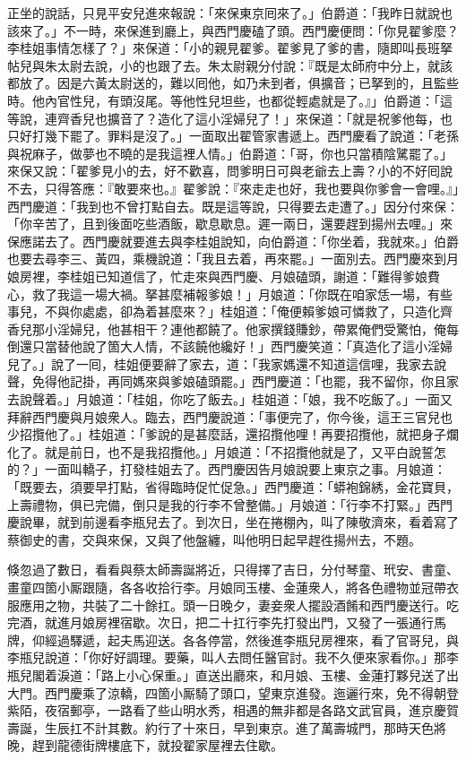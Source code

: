 正坐的說話，只見平安兒進來報說：「來保東京囘來了。」伯爵道：「我昨日就說也該來了。」不一時，來保進到廳上，與西門慶磕了頭。西門慶便問：「你見翟爹麼？李桂姐事情怎樣了？」來保道：「小的親見翟爹。翟爹見了爹的書，隨即叫長班拏帖兒與朱太尉去說，小的也跟了去。朱太尉親分付說：『既是太師府中分上，就該都放了。因是六黃太尉送的，難以囘他，如乃未到者，俱擴音；已拏到的，且監些時。他內官性兒，有頭沒尾。等他性兒坦些，也都從輕處就是了。』」伯爵道：「這等說，連齊香兒也擴音了？造化了這小淫婦兒了！」來保道：「就是祝爹他每，也只好打幾下罷了。罪料是沒了。」一面取出翟管家書遞上。西門慶看了說道：「老孫與祝麻子，做夢也不曉的是我這裡人情。」伯爵道：「哥，你也只當積陰騭罷了。」來保又說：「翟爹見小的去，好不歡喜，問爹明日可與老爺去上壽？小的不好囘說不去，只得答應：『敢要來也。』翟爹說：『來走走也好，我也要與你爹會一會哩。』」西門慶道：「我到也不曾打點自去。既是這等說，只得要去走遭了。」因分付來保：「你辛苦了，且到後面吃些酒飯，歇息歇息。遲一兩日，還要趕到揚州去哩。」來保應諾去了。西門慶就要進去與李桂姐說知，向伯爵道：「你坐着，我就來。」伯爵也要去尋李三、黃四，乘機說道：「我且去着，再來罷。」一面別去。西門慶來到月娘房裡，李桂姐已知道信了，忙走來與西門慶、月娘磕頭，謝道：「難得爹娘費心，救了我這一場大禍。拏甚麼補報爹娘！」{}月娘道：「你既在咱家恁一場，有些事兒，不與你處處，卻為着甚麼來？」桂姐道：「俺便賴爹娘可憐救了，只造化齊香兒那小淫婦兒，他甚相干？連他都饒了。他家撰錢賺鈔，帶累俺們受驚怕，俺每倒還只當替他說了箇大人情，不該饒他纔好！」{}西門慶笑道：「真造化了這小淫婦兒了。」說了一囘，桂姐便要辭了家去，道：「我家媽還不知道這信哩，我家去說聲，免得他記掛，再同媽來與爹娘磕頭罷。」西門慶道：「也罷，我不留你，你且家去說聲着。」月娘道：「桂姐，你吃了飯去。」桂姐道：「娘，我不吃飯了。」一面又拜辭西門慶與月娘衆人。臨去，西門慶說道：「事便完了，你今後，這王三官兒也少招攬他了。」{}{}桂姐道：「爹說的是甚麼話，還招攬他哩！再要招攬他，就把身子爛化了。就是前日，也不是我招攬他。」{}月娘道：「不招攬他就是了，又平白說誓怎的？」一面叫轎子，打發桂姐去了。西門慶因告月娘說要上東京之事。月娘道：「既要去，須要早打點，省得臨時促忙促急。」西門慶道：「蟒袍錦綉，金花寶貝，上壽禮物，俱已完備，倒只是我的行李不曾整備。」月娘道：「行李不打緊。」西門慶說畢，就到前邊看李瓶兒去了。到次日，坐在捲棚內，叫了陳敬濟來，看着寫了蔡御史的書，交與來保，又與了他盤纏，叫他明日起早趕徃揚州去，不題。

倏忽過了數日，看看與蔡太師壽誕將近，只得擇了吉日，分付琴童、玳安、書童、畫童四箇小厮跟隨，各各收拾行李。月娘同玉樓、金蓮衆人，將各色禮物並冠帶衣服應用之物，共裝了二十餘扛。頭一日晚夕，妻妾衆人擺設酒餚和西門慶送行。吃完酒，就進月娘房裡宿歇。次日，把二十扛行李先打發出門，又發了一張通行馬牌，仰經過驛遞，起夫馬迎送。各各停當，然後進李瓶兒房裡來，看了官哥兒，與李瓶兒說道：「你好好調理。要藥，叫人去問任醫官討。我不久便來家看你。」那李瓶兒閣着淚道：「路上小心保重。」直送出廳來，和月娘、玉樓、金蓮打夥兒送了出大門。西門慶乘了涼轎，四箇小厮騎了頭口，望東京進發。迤邐行來，免不得朝登紫陌，夜宿郵亭，{}一路看了些山明水秀，相遇的無非都是各路文武官員，進京慶賀壽誕，生辰扛不計其數。約行了十來日，早到東京。進了萬壽城門，那時天色將晚，趕到龍德街牌樓底下，就投翟家屋裡去住歇。

